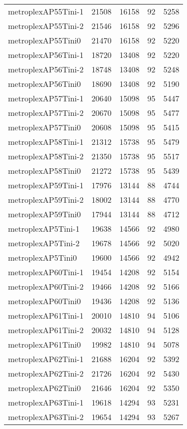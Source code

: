 \begin{longtable}{lrrrr}
metroplexAP55Tini-1 & 21508 & 16158 & 92 & 5258 \\
metroplexAP55Tini-2 & 21546 & 16158 & 92 & 5296 \\
metroplexAP55Tini0 & 21470 & 16158 & 92 & 5220 \\
metroplexAP56Tini-1 & 18720 & 13408 & 92 & 5220 \\
metroplexAP56Tini-2 & 18748 & 13408 & 92 & 5248 \\
metroplexAP56Tini0 & 18690 & 13408 & 92 & 5190 \\
metroplexAP57Tini-1 & 20640 & 15098 & 95 & 5447 \\
metroplexAP57Tini-2 & 20670 & 15098 & 95 & 5477 \\
metroplexAP57Tini0 & 20608 & 15098 & 95 & 5415 \\
metroplexAP58Tini-1 & 21312 & 15738 & 95 & 5479 \\
metroplexAP58Tini-2 & 21350 & 15738 & 95 & 5517 \\
metroplexAP58Tini0 & 21272 & 15738 & 95 & 5439 \\
metroplexAP59Tini-1 & 17976 & 13144 & 88 & 4744 \\
metroplexAP59Tini-2 & 18002 & 13144 & 88 & 4770 \\
metroplexAP59Tini0 & 17944 & 13144 & 88 & 4712 \\
metroplexAP5Tini-1 & 19638 & 14566 & 92 & 4980 \\
metroplexAP5Tini-2 & 19678 & 14566 & 92 & 5020 \\
metroplexAP5Tini0 & 19600 & 14566 & 92 & 4942 \\
metroplexAP60Tini-1 & 19454 & 14208 & 92 & 5154 \\
metroplexAP60Tini-2 & 19466 & 14208 & 92 & 5166 \\
metroplexAP60Tini0 & 19436 & 14208 & 92 & 5136 \\
metroplexAP61Tini-1 & 20010 & 14810 & 94 & 5106 \\
metroplexAP61Tini-2 & 20032 & 14810 & 94 & 5128 \\
metroplexAP61Tini0 & 19982 & 14810 & 94 & 5078 \\
metroplexAP62Tini-1 & 21688 & 16204 & 92 & 5392 \\
metroplexAP62Tini-2 & 21726 & 16204 & 92 & 5430 \\
metroplexAP62Tini0 & 21646 & 16204 & 92 & 5350 \\
metroplexAP63Tini-1 & 19618 & 14294 & 93 & 5231 \\
metroplexAP63Tini-2 & 19654 & 14294 & 93 & 5267 \\

\end{longtable}
